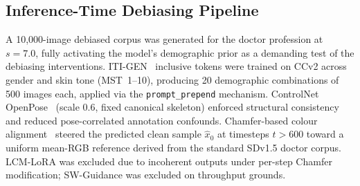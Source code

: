 \subsection{Inference-Time Debiasing Pipeline}

A 10,000-image debiased corpus was generated for the doctor profession at $s{=}7.0$,
fully activating the model's demographic prior as a demanding test of the debiasing
interventions. ITI-GEN~\cite{Zhang_2023_ITIGEN} inclusive tokens were trained on CCv2
across gender and skin tone (MST~1--10), producing 20 demographic combinations of 500
images each, applied via the \texttt{prompt\_prepend} mechanism. ControlNet
OpenPose~\cite{LZhang_2023_ControlNet} (scale 0.6, fixed canonical skeleton) enforced
structural consistency and reduced pose-correlated annotation confounds.
Chamfer-based colour alignment~\cite{Shum_2025_ColorAlignment} steered the predicted
clean sample $\hat{x}_0$ at timesteps $t{>}600$ toward a uniform mean-RGB reference
derived from the standard SDv1.5 doctor corpus. LCM-LoRA was excluded due to incoherent
outputs under per-step Chamfer modification; SW-Guidance was excluded on throughput
grounds.